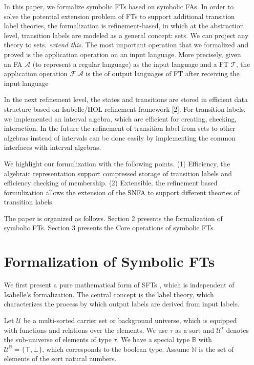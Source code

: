 \documentclass[a4paper,UKenglish,cleveref, autoref, thm-restate]{lipics-v2021}
\begin{document}
In this paper, we formalize symbolic FTs based on symbolic FAs. In order to solve the potential extension problem of FTs to support additional transition label theories, the formalization is refinement-based, in which at the abstraction level, transition labels are modeled as a general concept: sets. We can project any theory to sets. \emph{extend this}.
The most important operation that we formalized and proved is the application operation on an input language.  More precisely, given an FA $\mathcal{A}$ (to represent a regular language) as the input language and a FT $\mathcal{T}$, the application operation $\mathcal{F}~\mathcal{A}$ is the  of output languages of FT after receiving the input language 

In the next refinement level, the states and transitions are stored in efficient data structure based on Isabelle/HOL refinement framework [2].
For transition labels, we implemented an interval algebra, which are efficient for creating, checking, interaction.
%
In the future the refinement of transition label from sets to other algebras instead of intervals can be done easily by implementing the common interfaces with interval algebras.

We highlight our formulization with the following points.
(1) Efficiency, the algebraic representation
support compressed storage of transition labels and efficiency checking
of membership.
(2) Extensible, the refinement based formulization allows the extension
of the SNFA to support different theories of transition labels.

The paper is organized as follows.
Section 2 presents the formalization of symbolic FTs.
Section 3 presents the Core operations of symbolic FTs.





\section{Formalization of Symbolic FTs}


We first present a pure mathematical form of SFTs \cite{VeanesHLMB12Transducer}, which is independent of Isabelle's formalization. 
The central concept is the label theory, which characterizes the process by which output labels are derived from input labels.

Let $\mathcal{U}$ be a multi-sorted carrier set or background universe, which is equipped with functions and relations over the elements. We use $\tau$ as a sort and $\mathcal{U}^\tau$ denotes the sub-universe of elements of type $\tau$. 
We have a special type $\mathbb{B}$ with $\mathcal{U}^\mathbb{B} = \{ \top, \bot\}$, which corresponds to the boolean type. Assume $\mathbb{N}$ is the set of elements of the sort natural numbers.
\end{document}
